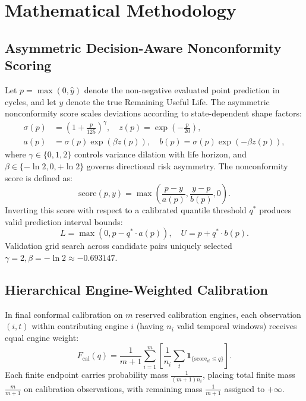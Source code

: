 \documentclass[conference,a4paper]{IEEEtran}
\newcommand{\LowerBound}{L}
\newcommand{\UpperBound}{U}
\newcommand{\sigmap}{\sigma(p)}
\newcommand{\zp}{z(p)}
\newcommand{\ap}{a(p)}
\newcommand{\bp}{b(p)}
\begin{document}
\section{Mathematical Methodology}

\subsection{Asymmetric Decision-Aware Nonconformity Scoring}
Let $p = \max(0, \hat{y})$ denote the non-negative evaluated point prediction in cycles, and let $y$ denote the true Remaining Useful Life. The asymmetric nonconformity score scales deviations according to state-dependent shape factors:
\begin{align}
\sigmap &= \left(1 + \frac{p}{125}\right)^\gamma, \quad \zp = \exp\left(-\frac{p}{20}\right), \\
\ap &= \sigmap \exp(\beta \zp), \quad \bp = \sigmap \exp(-\beta \zp),
\end{align}
where $\gamma \in \{0, 1, 2\}$ controls variance dilation with life horizon, and $\beta \in \{-\ln 2, 0, +\ln 2\}$ governs directional risk asymmetry. The nonconformity score is defined as:
\begin{equation}
\text{score}(p, y) = \max\left(\frac{p - y}{\ap}, \frac{y - p}{\bp}, 0\right).
\end{equation}
Inverting this score with respect to a calibrated quantile threshold $q^*$ produces valid prediction interval bounds:
\begin{equation}
\LowerBound = \max(0, p - q^* \cdot \ap), \quad \UpperBound = p + q^* \cdot \bp.
\end{equation}
Validation grid search across candidate pairs uniquely selected $\gamma = 2, \beta = -\ln 2 \approx -0.693147$.

\subsection{Hierarchical Engine-Weighted Calibration}
In final conformal calibration on $m$ reserved calibration engines, each observation $(i, t)$ within contributing engine $i$ (having $n_i$ valid temporal windows) receives equal engine weight:
\begin{equation}
F_{\text{cal}}(q) = \frac{1}{m+1} \sum_{i=1}^m \left[ \frac{1}{n_i} \sum_{t} \mathbf{1}_{\{\text{score}_{it} \le q\}} \right].
\end{equation}
Each finite endpoint carries probability mass $\frac{1}{(m+1)n_i}$, placing total finite mass $\frac{m}{m+1}$ on calibration observations, with remaining mass $\frac{1}{m+1}$ assigned to $+\infty$.
\end{document}
